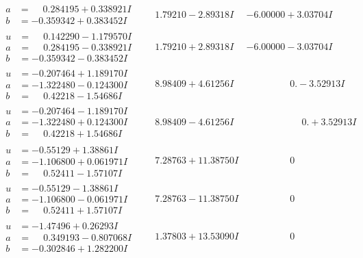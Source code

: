 \documentclass[1p]{elsarticle_modified}
\theoremstyle{definition}
\begin{document}
$$\begin{array}{c|c|c}
\begin{aligned}
a &= \phantom{-}0.284195 + 0.338921 I \\
b &= -0.359342 + 0.383452 I\end{aligned}
 & \phantom{-}1.79210 - 2.89318 I & -6.00000 + 3.03704 I \\ \hline\begin{aligned}
u &= \phantom{-}0.142290 - 1.179570 I \\
a &= \phantom{-}0.284195 - 0.338921 I \\
b &= -0.359342 - 0.383452 I\end{aligned}
 & \phantom{-}1.79210 + 2.89318 I & -6.00000 - 3.03704 I \\ \hline\begin{aligned}
u &= -0.207464 + 1.189170 I \\
a &= -1.322480 - 0.124300 I \\
b &= \phantom{-}0.42218 - 1.54686 I\end{aligned}
 & \phantom{-}8.98409 + 4.61256 I & \phantom{-0.000000 } 0. - 3.52913 I \\ \hline\begin{aligned}
u &= -0.207464 - 1.189170 I \\
a &= -1.322480 + 0.124300 I \\
b &= \phantom{-}0.42218 + 1.54686 I\end{aligned}
 & \phantom{-}8.98409 - 4.61256 I & \phantom{-0.000000 -}0. + 3.52913 I \\ \hline\begin{aligned}
u &= -0.55129 + 1.38861 I \\
a &= -1.106800 + 0.061971 I \\
b &= \phantom{-}0.52411 - 1.57107 I\end{aligned}
 & \phantom{-}7.28763 + 11.38750 I & \phantom{-0.000000 } 0 \\ \hline\begin{aligned}
u &= -0.55129 - 1.38861 I \\
a &= -1.106800 - 0.061971 I \\
b &= \phantom{-}0.52411 + 1.57107 I\end{aligned}
 & \phantom{-}7.28763 - 11.38750 I & \phantom{-0.000000 } 0 \\ \hline\begin{aligned}
u &= -1.47496 + 0.26293 I \\
a &= \phantom{-}0.349193 - 0.807068 I \\
b &= -0.302846 + 1.282200 I\end{aligned}
 & \phantom{-}1.37803 + 13.53090 I & \phantom{-0.000000 } 0 \\ \hline\begin{aligned}

\end{aligned}
\end{array}$$
\end{document}

